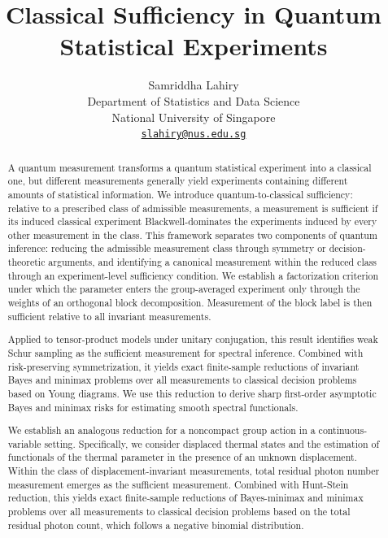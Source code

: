 \documentclass{article}
\title{Classical Sufficiency in Quantum Statistical Experiments}
\author{
Samriddha Lahiry\\
Department of Statistics and Data Science\\
National University of Singapore\\
\href{mailto:slahiry@nus.edu.sg}{\texttt{slahiry@nus.edu.sg}}
}
\date{}
\theoremstyle{named}
\theoremstyle{named1}
\theoremstyle{plain}
\theoremstyle{remark}
\begin{document}
\maketitle


\begin{abstract}
A quantum measurement transforms a quantum statistical experiment into a classical one, but different measurements generally yield experiments containing different amounts of statistical information. We introduce quantum-to-classical sufficiency: relative to a prescribed class of admissible measurements, a measurement is sufficient if its induced classical experiment Blackwell-dominates the experiments induced by every other measurement in the class. This framework separates two components of quantum inference: reducing the admissible measurement class through symmetry or decision-theoretic arguments, and identifying a canonical measurement within the reduced class through an experiment-level sufficiency condition.
We establish a factorization criterion under which the parameter enters the group-averaged experiment only through the weights of an orthogonal block decomposition. Measurement of the block label is then sufficient relative to all invariant measurements.

Applied to tensor-product models under unitary conjugation, this result identifies weak Schur sampling as the sufficient measurement for spectral inference. Combined with risk-preserving symmetrization, it yields exact finite-sample reductions of invariant Bayes and minimax problems over all measurements to classical decision problems based on Young diagrams. We use this reduction to derive sharp first-order asymptotic Bayes and minimax risks for estimating smooth spectral functionals.

We establish an analogous reduction for a noncompact group action in a continuous-variable setting. Specifically, we consider displaced thermal states and the estimation of functionals of the thermal parameter in the presence of an unknown displacement. Within the class of displacement-invariant measurements, total residual photon number measurement emerges as the sufficient measurement. Combined with Hunt-Stein reduction, this yields exact finite-sample reductions of Bayes-minimax and minimax problems over all measurements to classical decision problems based on the total residual photon count, which follows a negative binomial distribution.
\end{abstract}

\tableofcontents
\end{document}
